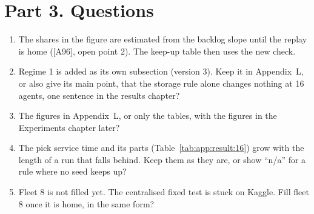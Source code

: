 \documentclass[11pt,a4paper]{article}
\newcommand{\new}[1]{\textcolor{newc}{#1}}
\begin{document}
\section*{Part 3. Questions}

\begin{enumerate}[leftmargin=1.4em]
\item The shares in the figure are estimated from the backlog slope until the replay is home
  ([A96], open point 2). The keep-up table then uses the new check.
\item \new{Regime 1 is added as its own subsection (version 3). Keep it in Appendix~L, or also give its
  main point, that the storage rule alone changes nothing at 16 agents, one sentence in the results
  chapter?}
\item The figures in Appendix~L, or only the tables, with the figures in the Experiments chapter
  later?
\item The pick service time and its parts (Table~\ref{tab:app:result:16}) grow with the length of a
  run that falls behind. Keep them as they are, or show ``n/a'' for a rule where no seed keeps up?
\item Fleet 8 is not filled yet. The centralised fixed test is stuck on Kaggle. Fill fleet 8 once it is
  home, in the same form?
\end{enumerate}
\end{document}
